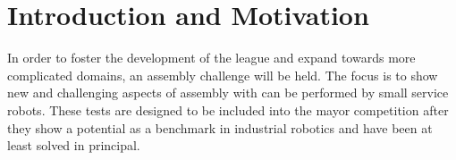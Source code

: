 \section{Introduction and Motivation}
In order to foster the development of the league and expand towards more complicated domains, an assembly challenge will be held. The focus is to show new and challenging aspects of assembly with can be performed by small service robots.
These tests are designed to be included into the mayor competition after they show a potential as a  benchmark in industrial robotics and have been at least solved in principal.

\par



%

%


